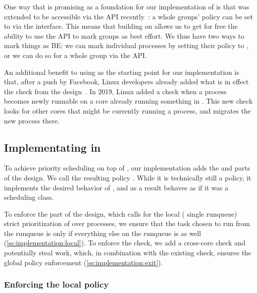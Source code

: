 One way that \schedidle{} is promising as a foundation for our implementation of
\beclass{} is that \schedidle{} was extended to be accessible via the \cgroups{}
API recently~\cite{lkml-idle-cgroup}: a whole groups' policy can be set to
\schedidle{} via the \cgroups{} interface. This means that building on
\schedidle{} allows us to get for free the ability to use the \cgroups{} API to
mark groups as best effort. We thus have two ways to mark things as BE: we can
mark individual processes by setting their policy to \schedidle{}, or we can do
so for a whole group via the \cgroups{} API.

An additional benefit to using \schedidle{} as the starting point for our
implementation is that, after a push by Facebook, Linux developers already added
what is in effect the \entry{} check from the \beclass{}
design~\cite{fixing-idle-article}. In 2019, Linux added a check when a
\schednormal{} process becomes newly runnable on a core already running something
in \schednormal{}. This new check looks for other cores that might be currently
running a \schedidle{} process, and migrates the new process there.

\subsection{Implementating \beclass{} in \schedbe{}}

To achieve priority scheduling on top of \schedidle{}, our implementation adds
the \local{} and \exit{} parts of the \beclass{} design. We call the resulting
policy \schedbe{}. While it is technically still a policy, it implements the
desired behavior of \beclass{}, and as a result behaves as if it was a
scheduling class.

To enforce the \local{} part of the design, which calls for the local (\ie{}
single runqueue) strict prioritization of \schednormal{} over \schedbe{}
processes, we ensure that the task chosen to run from the runqueue is only
\schedbe{} if everything else on the runqueue is as well
(\autoref{ss:implementation:local}). To enforce the \exit{} check, we add a
cross-core check and potentially steal work, which, in combination with the
existing \entry{} check, ensures the global policy enforcement
(\autoref{ss:implementation:exit}).

\subsubsection{Enforcing the local policy}\label{ss:implementation:local}

